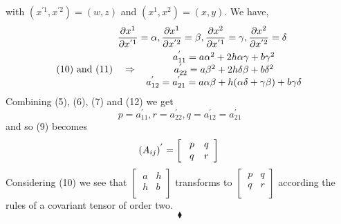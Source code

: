 with $(x^{'1},x^{'2}) = (w, z)$ and $(x^{1},x^{2}) = (x, y)$. We have,
\begin{align}
\ \pdv{x^1}{x^{'1}} &= \alpha, \pdv{x^1}{x^{'2}} = \beta,\pdv{x^2}{x^{'1}} = \gamma,\pdv{x^2}{x^{'2}} = \delta\\
\text{ (10) and (11)}\quad \Rightarrow\ &\begin{array}{c}
  \ a^{'}_{11} = a \alpha^2 + 2 h \alpha \gamma + b \gamma^2 \\
  \ a^{'}_{22} = a \beta^2 + 2 h \delta \beta + b \delta^2 \\
  \ a^{'}_{12} = a^{'}_{21} =a \alpha \beta + h( \alpha \delta + \gamma \beta) + b \gamma \delta \\
  \end{array}
\end{align}
Combining (5), (6), (7) and (12) we get $$ p = a^{'}_{11}, r = a^{'}_{22}, q =  a^{'}_{12} = a^{'}_{21}$$ and so (9) becomes $$  (A_{ij})^{'} = \left[ { \begin{array}{cc}
  \ p &  q\\
  \ q  & r\\
  \end{array}} \right] \\$$
Considering (10) we see that $\left[ { \begin{array}{cc}
  \ a &  h\\
  \ h   &b\\
  \end{array}} \right] $ transforms to $\left[ { \begin{array}{cc}
  \ p &  q\\
  \ q  & r\\
  \end{array}} \right]$ according the rules of a covariant tensor of order two.
$$\blacklozenge$$
\pagebreak[4]


